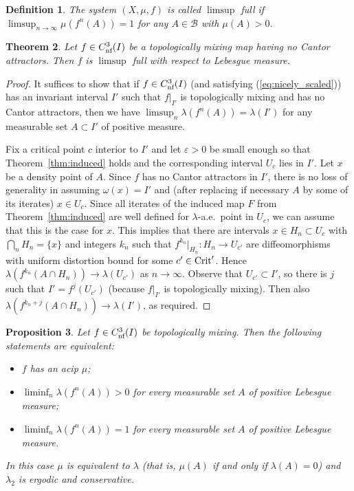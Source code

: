 \documentclass[12pt, psamsfonts, reqno]{amsart}
\newtheorem{theorem}{Theorem}
\newtheorem{proposition}[theorem]{Proposition}
\newtheorem{definition}[theorem]{Definition}
\begin{document}
\begin{definition}\label{def:limsup_full}
The system $(X,\mu,f)$  is called \emph{ $\limsup$ full} if
$\limsup_{n\to \infty} \mu(f^n(A))=1$ for any $A \in {\mathcal B}$
with $\mu(A) > 0$.
\end{definition}

\begin{theorem}\label{thm:limsup_full}
 Let $f\in {C^3_{\text{\rm nf}}}(I)$ be a topologically mixing map having no
 Cantor attractors. Then $f$ is $\limsup$ full with respect to
 Lebesgue measure.
\end{theorem}

\begin{proof}
It suffices to show that if $f\in {C^3_{\text{\rm nf}}}(I)$ (and satisfying
(\ref{eq:nicely_scaled})) has an invariant interval $I'$ such that
$f|_{I'}$ is topologically mixing and has no Cantor attractors,
then we have $\limsup_n \lambda(f^n(A))=\lambda(I')$ for any
measurable set $A\subset I'$ of positive measure.

Fix a critical point $c$ interior to $I'$ and let ${\varepsilon}>0$ be
small enough so that Theorem~\ref{thm:induced} holds and the
corresponding interval $U_c$ lies in $I'$. Let $x$ be a density
point of $A$. Since $f$ has no Cantor attractors in $I'$, there is
no loss of generality in assuming $\omega(x) = I'$ and (after
replacing if necessary $A$ by some of its iterates)  $x\in U_c$.
Since all iterates of the induced map $F$ from
Theorem~\ref{thm:induced} are well defined for $\lambda$-a.e.\
point in $U_c$, we can assume that this is the case for $x$. This
implies that there are intervals $x\in H_n\subset U_c$ with
$\bigcap_n H_n = \{ x \}$ and integers $k_n$ such that
$f^{k_n}|_{H_n}:H_n \to U_{c'}$ are diffeomorphisms with uniform
distortion bound for some $c' \in {\mathop{\rm Crit}\nolimits}'$.  Hence $\lambda(f^{k_n}
(A \cap H_n) ) \to \lambda(U_{c'})$ as $n \to \infty$. Observe
that $U_{c'}\subset I'$, so there is $j$ such that $I' =
f^j(U_{c'})$ (because $f|_{I'}$ is topologically mixing). Then
also $\lambda(f^{k_n+j}(A \cap H_n)) \to \lambda(I')$, as
required.
\end{proof}

\begin{proposition}\label{prop:limsup_full_equiv}
 Let $f\in {C^3_{\text{\rm nf}}}(I)$ be topologically mixing.
 Then the following statements are equivalent:
 \begin{itemize}
   \item[(i)] $f$ has an acip $\mu$;
   \item[(ii)] $\liminf_n \lambda(f^n(A))>0$
     for every measurable set $A$ of positive Lebesgue measure;
   \item[(iii)] $\liminf_n \lambda(f^n(A))=1$
     for every measurable set $A$ of positive Lebesgue measure.
 \end{itemize}
 In this case $\mu$ is equivalent to
 $\lambda$ (that is, $\mu(A)$ if and only if $\lambda(A)=0$) and
 $\lambda_2$ is ergodic and conservative.
\end{proposition}
\end{document}
